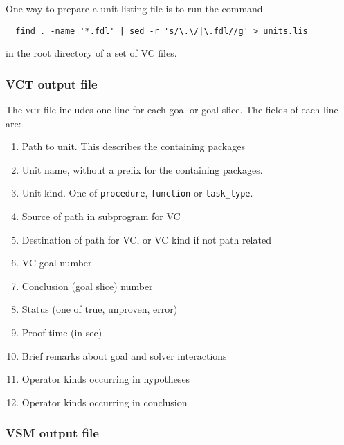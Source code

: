 \documentclass[12pt,fleqn]{article}
\newcommand{\csv}{\textsc{vct}}
\begin{document}
One way to prepare a unit listing file is to run the command
\begin{verbatim}
  find . -name '*.fdl' | sed -r 's/\.\/|\.fdl//g' > units.lis
\end{verbatim}
in the root directory of a set of VC files.


\subsubsection{VCT output file}

The \csv{} file includes one line for each goal or goal slice. The fields
of each line are:
\begin{enumerate}
\item Path to unit. This describes the containing packages
\item Unit name, without a prefix for the containing packages.
\item Unit kind.  One of \texttt{procedure}, 
  \texttt{function} or \texttt{task\_type}.
\item Source of path in subprogram for VC 
\item Destination of path for VC, or VC kind if not path related
\item VC goal number
\item Conclusion (goal slice) number 
\item Status (one of true, unproven, error)
\item Proof time (in sec)
\item Brief remarks about goal and solver interactions
\item Operator kinds occurring in hypotheses
\item Operator kinds occurring in conclusion
\end{enumerate}

\subsubsection{VSM output file}
\end{document}
